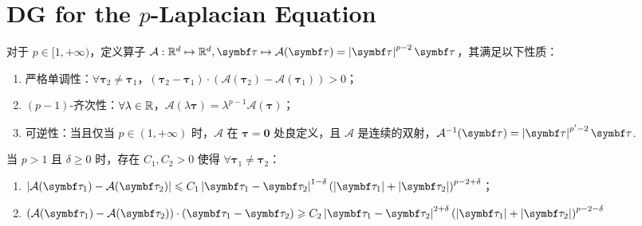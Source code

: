 \section{DG for the \texorpdfstring{\(p\)}{p}-Laplacian Equation}

对于 \(p \in [1, +\infty)\)，定义算子 \(\mathcal{A}: \R^d \mapsto \R^d, \bm\tau \mapsto \mathcal{A}(\bm\tau) = \abs{\bm\tau}^{p-2} \bm\tau\)，其满足以下性质：
\begin{enumerate}
	\item 严格单调性：\(\forall \bm\tau_2 \neq \bm\tau_1\)，\(\left(\bm\tau_{2} - \bm\tau_{1}\right) \cdot \left(\mathcal{A}(\bm\tau_{2}) - \mathcal{A}(\bm\tau_{1})\right) > 0\)；
	\item \((p-1)\)-齐次性：\(\forall \lambda \in \mathbb{R}\)，\(\mathcal{A}(\lambda \bm\tau) = \lambda^{p-1} \mathcal{A}(\bm\tau)\)；
	\item 可逆性：当且仅当 \(p \in (1, +\infty)\) 时，\(\mathcal{A}\) 在 \(\bm\tau = \bm 0\) 处良定义，且 \(\mathcal{A}\) 是连续的双射，\(\mathcal{A}^{-1}(\bm\tau) = \abs{\bm\tau}^{p' - 2} \bm\tau\).
\end{enumerate}

\begin{lemma}[{\cite[Lemma 2.1]{10.1090/S0025-5718-1993-1192966-4}}]\label{estimate for the A-operator}
	当 \(p > 1\) 且 \(\delta \geqslant 0\) 时，存在 \(C_1, C_2 > 0\) 使得 \(\forall \bm\tau_1 \neq \bm\tau_2\)：
	\begin{enumerate}
		\item \(\abs{\mathcal{A}(\bm\tau_1) - \mathcal{A}(\bm\tau_2)} \leqslant C_1 \abs{\bm\tau_1 - \bm\tau_2}^{1-\delta} \left(\abs{\bm\tau_1} + \abs{\bm\tau_2}\right)^{p-2+\delta}\)；
		\item \(\left(\mathcal{A}(\bm\tau_1) - \mathcal{A}(\bm\tau_2)\right) \cdot \left(\bm\tau_1 - \bm\tau_2\right) \geqslant C_2 \abs{\bm\tau_1 - \bm\tau_2}^{2 + \delta} \left(\abs{\bm\tau_1} + \abs{\bm\tau_2}\right)^{p-2-\delta}\)
	\end{enumerate}
\end{lemma}

